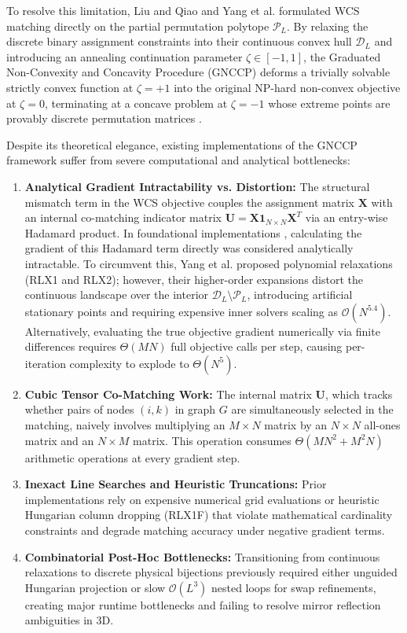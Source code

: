 \documentclass[conference]{IEEEtran}
\begin{document}
To resolve this limitation, Liu and Qiao \cite{liu2015graduated} and Yang et al. \cite{yang2018algorithm} formulated WCS matching directly on the partial permutation polytope $\mathcal{P}_L$. By relaxing the discrete binary assignment constraints into their continuous convex hull $\mathcal{D}_L$ and introducing an annealing continuation parameter $\zeta \in [-1, 1]$, the Graduated Non-Convexity and Concavity Procedure (GNCCP) deforms a trivially solvable strictly convex function at $\zeta = +1$ into the original NP-hard non-convex objective at $\zeta = 0$, terminating at a concave problem at $\zeta = -1$ whose extreme points are provably discrete permutation matrices \cite{yang2018algorithm}.

Despite its theoretical elegance, existing implementations of the GNCCP framework suffer from severe computational and analytical bottlenecks:
\begin{enumerate}
    \item \textbf{Analytical Gradient Intractability vs. Distortion:} The structural mismatch term in the WCS objective couples the assignment matrix $\mathbf{X}$ with an internal co-matching indicator matrix $\mathbf{U} = \mathbf{X}\mathbf{1}_{N\times N}\mathbf{X}^T$ via an entry-wise Hadamard product. In foundational implementations \cite{yang2018algorithm}, calculating the gradient of this Hadamard term directly was considered analytically intractable. To circumvent this, Yang et al. \cite{yang2018algorithm} proposed polynomial relaxations (RLX1 and RLX2); however, their higher-order expansions distort the continuous landscape over the interior $\mathcal{D}_L \setminus \mathcal{P}_L$, introducing artificial stationary points and requiring expensive inner solvers scaling as $\mathcal{O}(N^{5.4})$. Alternatively, evaluating the true objective gradient numerically via finite differences requires $\Theta(MN)$ full objective calls per step, causing per-iteration complexity to explode to $\Theta(N^5)$.
    \item \textbf{Cubic Tensor Co-Matching Work:} The internal matrix $\mathbf{U}$, which tracks whether pairs of nodes $(i, k)$ in graph $G$ are simultaneously selected in the matching, naively involves multiplying an $M \times N$ matrix by an $N \times N$ all-ones matrix and an $N \times M$ matrix. This operation consumes $\Theta(MN^2 + M^2N)$ arithmetic operations at every gradient step.
    \item \textbf{Inexact Line Searches and Heuristic Truncations:} Prior implementations rely on expensive numerical grid evaluations or heuristic Hungarian column dropping (RLX1F) that violate mathematical cardinality constraints and degrade matching accuracy under negative gradient terms.
    \item \textbf{Combinatorial Post-Hoc Bottlenecks:} Transitioning from continuous relaxations to discrete physical bijections previously required either unguided Hungarian projection or slow $\mathcal{O}(L^3)$ nested loops for swap refinements, creating major runtime bottlenecks and failing to resolve mirror reflection ambiguities in 3D.
\end{enumerate}
\end{document}
